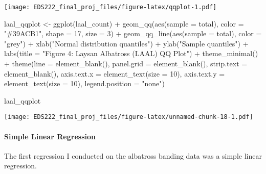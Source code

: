 \documentclass[
]{article}
\newenvironment{Shaded}{\begin{snugshade}}{\end{snugshade}}
\newcommand{\AttributeTok}[1]{\textcolor[rgb]{0.77,0.63,0.00}{#1}}
\newcommand{\DecValTok}[1]{\textcolor[rgb]{0.00,0.00,0.81}{#1}}
\newcommand{\FunctionTok}[1]{\textcolor[rgb]{0.00,0.00,0.00}{#1}}
\newcommand{\NormalTok}[1]{#1}
\newcommand{\OtherTok}[1]{\textcolor[rgb]{0.56,0.35,0.01}{#1}}
\newcommand{\SpecialCharTok}[1]{\textcolor[rgb]{0.00,0.00,0.00}{#1}}
\newcommand{\StringTok}[1]{\textcolor[rgb]{0.31,0.60,0.02}{#1}}
\begin{document}
\texttt{[image: EDS222\_final\_proj\_files/figure-latex/qqplot-1.pdf]}

\begin{Shaded}
\begin{Highlighting}[]
\NormalTok{laal\_qqplot }\OtherTok{\textless{}{-}} \FunctionTok{ggplot}\NormalTok{(laal\_count) }\SpecialCharTok{+}
  \FunctionTok{geom\_qq}\NormalTok{(}\FunctionTok{aes}\NormalTok{(}\AttributeTok{sample =}\NormalTok{ total),}
          \AttributeTok{color =} \StringTok{"\#39ACB1"}\NormalTok{,}
          \AttributeTok{shape =} \DecValTok{17}\NormalTok{,}
          \AttributeTok{size =} \DecValTok{3}\NormalTok{) }\SpecialCharTok{+}
  \FunctionTok{geom\_qq\_line}\NormalTok{(}\FunctionTok{aes}\NormalTok{(}\AttributeTok{sample =}\NormalTok{ total),}
            \AttributeTok{color =} \StringTok{"grey"}\NormalTok{) }\SpecialCharTok{+}
  \FunctionTok{xlab}\NormalTok{(}\StringTok{"Normal distribution quantiles"}\NormalTok{) }\SpecialCharTok{+}
  \FunctionTok{ylab}\NormalTok{(}\StringTok{"Sample quantiles"}\NormalTok{) }\SpecialCharTok{+}
  \FunctionTok{labs}\NormalTok{(}\AttributeTok{title =} \StringTok{"Figure 4: Laysan Albatross (LAAL) QQ Plot"}\NormalTok{) }\SpecialCharTok{+}
  \FunctionTok{theme\_minimal}\NormalTok{() }\SpecialCharTok{+}
  \FunctionTok{theme}\NormalTok{(}\AttributeTok{line =} \FunctionTok{element\_blank}\NormalTok{(),}
        \AttributeTok{panel.grid =} \FunctionTok{element\_blank}\NormalTok{(),}
        \AttributeTok{strip.text =} \FunctionTok{element\_blank}\NormalTok{(),}
        \AttributeTok{axis.text.x =} \FunctionTok{element\_text}\NormalTok{(}\AttributeTok{size =} \DecValTok{10}\NormalTok{),}
        \AttributeTok{axis.text.y =} \FunctionTok{element\_text}\NormalTok{(}\AttributeTok{size =} \DecValTok{10}\NormalTok{),}
        \AttributeTok{legend.position =} \StringTok{"none"}\NormalTok{)}

\NormalTok{laal\_qqplot }
\end{Highlighting}
\end{Shaded}

\texttt{[image: EDS222\_final\_proj\_files/figure-latex/unnamed-chunk-18-1.pdf]}

\hypertarget{simple-linear-regression}{%
\paragraph{Simple Linear Regression}\label{simple-linear-regression}}

The first regression I conducted on the albatross banding data was a
simple linear regression.
\end{document}
